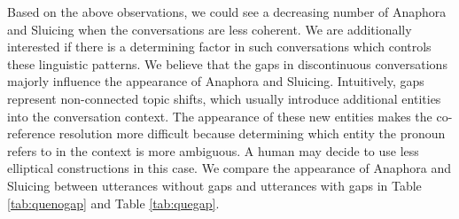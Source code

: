 \documentclass[bsc,frontabs,twoside,singlespacing,parskip,deptreport]{infthesis}     %
\begin{document}
Based on the above observations, we could see a decreasing number of Anaphora and Sluicing when the conversations are less coherent. We are additionally interested if there is a determining factor in such conversations which controls these linguistic patterns. We believe that the gaps in discontinuous conversations majorly influence the appearance of Anaphora and Sluicing. Intuitively, gaps represent non-connected topic shifts, which usually introduce additional entities into the conversation context. The appearance of these new entities makes the co-reference resolution more difficult because determining which entity the pronoun refers to in the context is more ambiguous. A human may decide to use less elliptical constructions in this case. We compare the appearance of Anaphora and Sluicing between utterances without gaps and utterances with gaps in Table \ref{tab:quenogap} and Table \ref{tab:quegap}.
\end{document}
